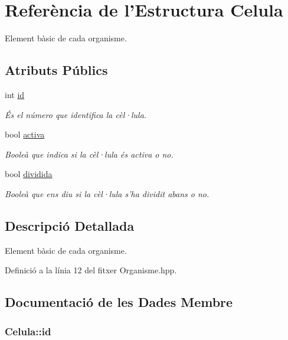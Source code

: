 \hypertarget{struct_celula}{\section{Referència de l'Estructura Celula}
\label{struct_celula}
}


Element bàsic de cada organisme.  


\subsection*{Atributs Públics}
\begin{DoxyCompactItemize}
\item 
int \hyperlink{struct_celula_a30cd8be20156f6276eb9cc0b47a1f83a}{id}
\begin{DoxyCompactList}\small\item\em És el número que identifica la cèl·lula. \end{DoxyCompactList}\item 
bool \hyperlink{struct_celula_ad9c2e6f0c72719aa73b472bb44434098}{activa}
\begin{DoxyCompactList}\small\item\em Booleà que indica si la cèl·lula és activa o no. \end{DoxyCompactList}\item 
bool \hyperlink{struct_celula_ada607a6566845c6511d8fd827d33e8d4}{dividida}
\begin{DoxyCompactList}\small\item\em Booleà que ens diu si la cèl·lula s'ha dividit abans o no. \end{DoxyCompactList}\end{DoxyCompactItemize}


\subsection{Descripció Detallada}
Element bàsic de cada organisme. 

Definició a la línia 12 del fitxer Organisme.\-hpp.



\subsection{Documentació de les Dades Membre}
\hypertarget{struct_celula_a30cd8be20156f6276eb9cc0b47a1f83a}{
\subsubsection[{id}]{\setlength{\rightskip}{0pt plus 5cm}Celula\-::id}}\label{struct_celula_a30cd8be20156f6276eb9cc0b47a1f83a}


